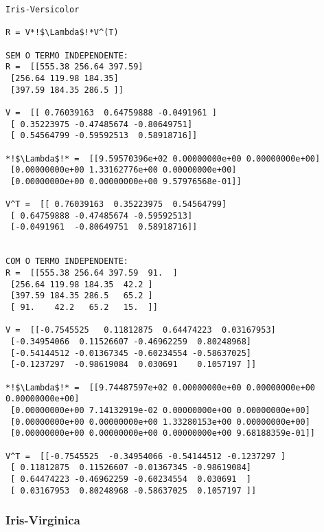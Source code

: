 \documentclass[a4paper,12pt,twoside]{article}
\begin{document}
\begin{lstlisting}
Iris-Versicolor

R = V*!$\Lambda$!*V^(T)

SEM O TERMO INDEPENDENTE: 
R =  [[555.38 256.64 397.59]
 [256.64 119.98 184.35]
 [397.59 184.35 286.5 ]]

V =  [[ 0.76039163  0.64759888 -0.0491961 ]
 [ 0.35223975 -0.47485674 -0.80649751]
 [ 0.54564799 -0.59592513  0.58918716]]

*!$\Lambda$!* =  [[9.59570396e+02 0.00000000e+00 0.00000000e+00]
 [0.00000000e+00 1.33162776e+00 0.00000000e+00]
 [0.00000000e+00 0.00000000e+00 9.57976568e-01]]

V^T =  [[ 0.76039163  0.35223975  0.54564799]
 [ 0.64759888 -0.47485674 -0.59592513]
 [-0.0491961  -0.80649751  0.58918716]]


COM O TERMO INDEPENDENTE: 
R =  [[555.38 256.64 397.59  91.  ]
 [256.64 119.98 184.35  42.2 ]
 [397.59 184.35 286.5   65.2 ]
 [ 91.    42.2   65.2   15.  ]]

V =  [[-0.7545525   0.11812875  0.64474223  0.03167953]
 [-0.34954066  0.11526607 -0.46962259  0.80248968]
 [-0.54144512 -0.01367345 -0.60234554 -0.58637025]
 [-0.1237297  -0.98619084  0.030691    0.1057197 ]]

*!$\Lambda$!* =  [[9.74487597e+02 0.00000000e+00 0.00000000e+00 0.00000000e+00]
 [0.00000000e+00 7.14132919e-02 0.00000000e+00 0.00000000e+00]
 [0.00000000e+00 0.00000000e+00 1.33280153e+00 0.00000000e+00]
 [0.00000000e+00 0.00000000e+00 0.00000000e+00 9.68188359e-01]]

V^T =  [[-0.7545525  -0.34954066 -0.54144512 -0.1237297 ]
 [ 0.11812875  0.11526607 -0.01367345 -0.98619084]
 [ 0.64474223 -0.46962259 -0.60234554  0.030691  ]
 [ 0.03167953  0.80248968 -0.58637025  0.1057197 ]]
\end{lstlisting}

\subsubsection{Iris-Virginica}
\end{document}

